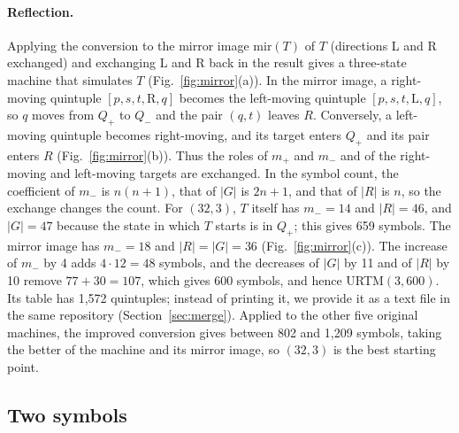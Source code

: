 \documentclass{article}
\theoremstyle{definition}
\theoremstyle{remark}
\begin{document}
\paragraph{Reflection.}
Applying the conversion to the mirror image $\mathrm{mir}(T)$ of $T$ (directions L and R exchanged) and exchanging L and R back in the result gives a three-state machine that simulates $T$ (Fig.~\ref{fig:mirror}(a)).
In the mirror image, a right-moving quintuple $[p,s,t,\mathrm{R},q]$ becomes the left-moving quintuple $[p,s,t,\mathrm{L},q]$, so $q$ moves from $Q_+$ to $Q_-$ and the pair $(q,t)$ leaves $R$. Conversely, a left-moving quintuple becomes right-moving, and its target enters $Q_+$ and its pair enters $R$ (Fig.~\ref{fig:mirror}(b)).
Thus the roles of $m_+$ and $m_-$ and of the right-moving and left-moving targets are exchanged.
In the symbol count, the coefficient of $m_-$ is $n(n+1)$, that of $|G|$ is $2n+1$, and that of $|R|$ is $n$, so the exchange changes the count.
For $(32,3)$, $T$ itself has $m_-=14$ and $|R|=46$, and $|G|=47$ because the state in which $T$ starts is in $Q_+$; this gives 659 symbols. The mirror image has $m_-=18$ and $|R|=|G|=36$ (Fig.~\ref{fig:mirror}(c)). The increase of $m_-$ by 4 adds $4\cdot 12=48$ symbols, and the decreases of $|G|$ by 11 and of $|R|$ by 10 remove $77+30=107$, which gives 600 symbols, and hence URTM$(3,600)$. Its table has 1,572 quintuples; instead of printing it, we provide it as a text file in the same repository (Section~\ref{sec:merge}).
Applied to the other five original machines, the improved conversion gives between 802 and 1,209 symbols, taking the better of the machine and its mirror image, so $(32,3)$ is the best starting point.

\subsection{Two symbols}
\label{sec:two}
\end{document}
